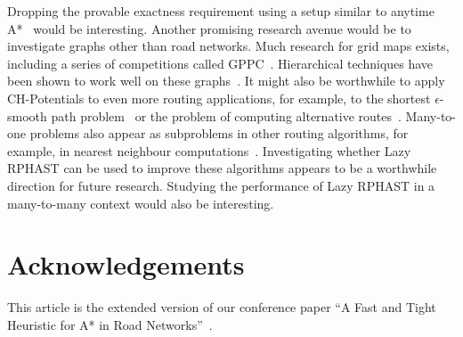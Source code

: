 \documentclass[manuscript,review]{acmart}
\begin{document}
Dropping the provable exactness requirement using a setup similar to anytime A*~\cite{DBLP:conf/aaai/ZhouH02,DBLP:conf/nips/LikhachevGT03} would be interesting.
Another promising research avenue would be to investigate graphs other than road networks.
Much research for grid maps exists, including a series of competitions called GPPC~\cite{DBLP:conf/socs/SturtevantTTUKS15}.
Hierarchical techniques have been shown to work well on these graphs~\cite{DBLP:conf/aaai/UrasK14}.
It might also be worthwhile to apply CH-Potentials to even more routing applications, for example, to the shortest $\epsilon$-smooth path problem~\cite{dss-tarrn-18} or the problem of computing alternative routes~\cite{adgw-arrn-13,bdgs-argrn-11,kobitzsch2015alternative}.
Many-to-one problems also appear as subproblems in other routing algorithms, for example, in nearest neighbour computations~\cite{buchhold_et_al:LIPIcs.SEA.2021.18}.
Investigating whether Lazy RPHAST can be used to improve these algorithms appears to be a worthwhile direction for future research.
Studying the performance of Lazy RPHAST in a many-to-many context would also be interesting.

\section*{Acknowledgements}
This article is the extended version of our conference paper ``A Fast and Tight Heuristic for A* in Road Networks''~\cite{strasser_et_al:LIPIcs.SEA.2021.6}.








\end{document}
